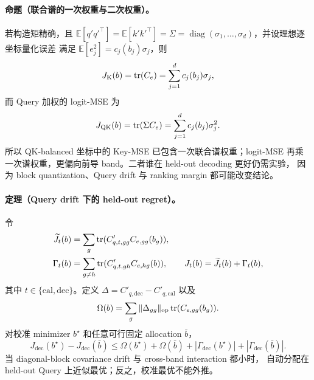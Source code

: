 \paragraph{命题（联合谱的一次权重与二次权重）。}
若构造矩精确，且
$\mathbb E[q'q'^\top]=\mathbb E[k'k'^\top]
=\Sigma=\operatorname{diag}(\sigma_1,\ldots,\sigma_d)$，并设理想逐坐标量化误差
满足 $\mathbb E[e_j^2]=c_j(b_j)\sigma_j$，则
\begin{equation}
 J_{\rm K}(b)=\operatorname{tr}(C_e)
 =\sum_{j=1}^{d}c_j(b_j)\sigma_j,
 \label{eq:keymse-joint-spectrum}
\end{equation}
而 Query 加权的 logit-MSE 为
\begin{equation}
 J_{\rm QK}(b)=\operatorname{tr}(\Sigma C_e)
 =\sum_{j=1}^{d}c_j(b_j)\sigma_j^2.
 \label{eq:qmse-joint-spectrum}
\end{equation}
所以 QK-balanced 坐标中的 Key-MSE 已包含一次联合谱权重；logit-MSE 再乘
一次谱权重，更偏向前导 band。二者谁在 held-out decoding 更好仍需实验，
因为 block quantization、Query drift 与 ranking margin 都可能改变结论。

\paragraph{定理（Query drift 下的 held-out regret）。}
令
\begin{align}
 \widetilde J_t(b)
 &=\sum_g\operatorname{tr}(C'_{q,t,gg}C_{e,gg}(b_g)),\\
 \Gamma_t(b)
 &=\sum_{g\ne h}\operatorname{tr}(C'_{q,t,gh}C_{e,hg}(b)),\qquad
 J_t(b)=\widetilde J_t(b)+\Gamma_t(b),
\end{align}
其中 $t\in\{\mathrm{cal},\mathrm{dec}\}$。定义
$\Delta=C'_{q,\mathrm{dec}}-C'_{q,\mathrm{cal}}$ 以及
\begin{equation}
 \Omega(b)=\sum_g\|\Delta_{gg}\|_{\mathrm{op}}
                    \operatorname{tr}(C_{e,gg}(b_g)).
 \label{eq:allocation-drift-penalty}
\end{equation}
对校准 minimizer $b^\star$ 和任意可行固定 allocation $\bar b$，
\begin{equation}
 J_{\mathrm{dec}}(b^\star)-J_{\mathrm{dec}}(\bar b)
 \le \Omega(b^\star)+\Omega(\bar b)
 +|\Gamma_{\mathrm{dec}}(b^\star)|
 +|\Gamma_{\mathrm{dec}}(\bar b)|.
 \label{eq:heldout-allocation-regret}
\end{equation}
当 diagonal-block covariance drift 与 cross-band interaction 都小时，
自动分配在 held-out Query 上近似最优；反之，校准最优不能外推。


